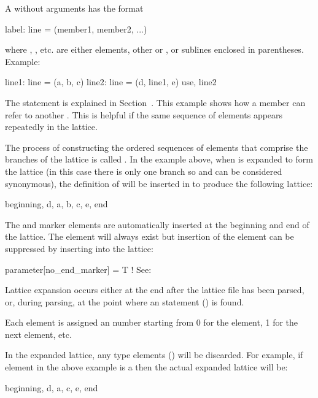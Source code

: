 A  without arguments has the format
\begin{example}
  label: line = (member1, member2, ...)
\end{example}
where , , etc. are either elements, other  or , or sublines enclosed in parentheses.  Example:
\begin{example}
  line1: line = (a, b, c)
  line2: line = (d, line1, e)
  use, line2
\end{example}
The  statement is explained in Section~.  This example shows how a  member can refer to another . This is helpful if the same sequence of elements
appears repeatedly in the lattice.

The process of constructing the ordered sequences of elements that comprise the branches of the
lattice is called . In the example above, when  is expanded to form
the lattice (in this case there is only one branch so  and  can be considered
synonymous), the definition of  will be inserted in to produce the following lattice:
\begin{example}
  beginning, d, a, b, c, e, end
\end{example}
The  and  marker elements are automatically inserted at the beginning and end
of the lattice. The  element will always exist but insertion of the  element
can be suppressed by inserting into the lattice:
\begin{example}
 parameter[no_end_marker] = T    ! See: 
\end{example}
Lattice expansion occurs either at the end after the lattice file has been parsed, or, during parsing, at the
point where an  statement () is found.

Each element is assigned an  number starting from 0 for the 
element, 1 for the next element, etc.

In the expanded lattice, any  type elements () will be discarded. For
example, if element  in the above example is a  then the actual expanded lattice
will be:
\begin{example}
  beginning, d, a, c, e, end
\end{example}

